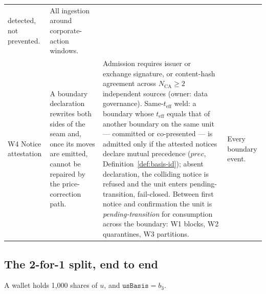 \begin{center}
\begin{longtable}{@{}p{2.2cm} p{3.6cm} p{4.7cm} p{2.9cm}@{}}
detected, not prevented. & All ingestion around corporate-action windows. \\
\addlinespace
W4 Notice attestation & A boundary declaration rewrites both sides of the seam and,
once its moves are emitted, cannot be repaired by the price-correction path. & Admission
requires issuer or exchange signature, or content-hash agreement across
$N_{\mathrm{CA}}\ge2$ independent sources (owner: data governance). Same-$t_{\mathrm{eff}}$
weld: a boundary whose $t_{\mathrm{eff}}$ equals that of another boundary on the same
unit --- committed or co-presented --- is admitted only if the attested notices declare
mutual precedence ($\mathit{prec}$, Definition~\ref{def:basis-id}); absent
declaration, the colliding notice is refused and the unit enters pending-transition,
fail-closed. Between
first notice and confirmation the unit is \emph{pending-transition} for
consumption across the boundary: W1 blocks, W2
quarantines, W3 partitions. & Every boundary event. \\
\bottomrule
\end{longtable}
\end{center}

\subsection{The 2-for-1 split, end to end}
\label{sec:basis-worked}

A wallet holds 1{,}000 shares of $u$, and $\texttt{usBasis}=b_3$.

